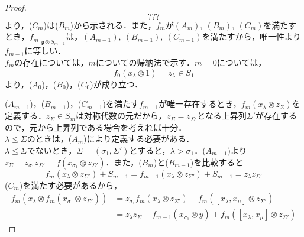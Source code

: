 \documentclass[rep_main]{subfiles}
\begin{document}
\begin{proof}
	\begin{equation}
		???
	\end{equation}
	より，($C_m$)は($B_m$)から示される．また，$f_m$が$(A_m),\ (B_m),\ (C_m)$を満たすとき，$f_m|_{\mathfrak{g} \otimes S_{m-1}}$は，$(A_{m-1}),\ (B_{m-1}),\ (C_{m-1})$を満たすから，唯一性より$f_{m-1}$に等しい．\\
	$f_m$の存在については，$m$についての帰納法で示す．$m = 0$については，
	\begin{equation}
		f_0(x_\lambda \otimes 1) = z_\lambda \in S_1
	\end{equation}
	より，($A_0$)，($B_0$)，($C_0$)が成り立つ．
	
	($A_{m-1}$)，($B_{m-1}$)，($C_{m-1}$)を満たす$f_{m-1}$が唯一存在するとき，$f_m(x_\lambda \otimes z_\Sigma)$を定義する．$z_\Sigma \in S_m$は対称代数の元だから，$z_\Sigma = z_{\Sigma'}$となる上昇列$\Sigma'$が存在するので，元から上昇列である場合を考えれば十分．\\
	$\lambda \leq \Sigma$のときは，($A_m$)により定義する必要がある．\\
	$\lambda \leq \Sigma$でないとき，$\Sigma = (\sigma_1, \Sigma')$とすると，$\lambda > \sigma_1$．($A_{m-1}$)より$z_\Sigma = z_{\sigma_1}z_{\Sigma'} = f(x_{\sigma_1} \otimes z_{\Sigma'})$．また，($B_m$)と($B_{m-1}$)を比較すると
	\begin{equation}
		f_m(x_\lambda \otimes z_{\Sigma'}) + S_{m-1}  =  f_{m-1}(x_\lambda \otimes z_{\Sigma'}) + S_{m-1} =  z_\lambda z_{\Sigma'}
	\end{equation}
	($C_m$)を満たす必要があるから，
	\begin{align}
		f_m(x_\lambda \otimes f_m(x_{\sigma_1} \otimes z_{\Sigma'})) &= z_{\sigma_1}f_m(x_\lambda \otimes z_{\Sigma'}) + f_m([x_\lambda, x_\mu] \otimes z_{\Sigma'}) \\
		&= z_\lambda z_\Sigma + f_{m-1}(x_{\sigma_1} \otimes y) + f_m([x_\lambda, x_\mu] \otimes z_{\Sigma'})
	\end{align}
	
\end{proof}
\end{document}
